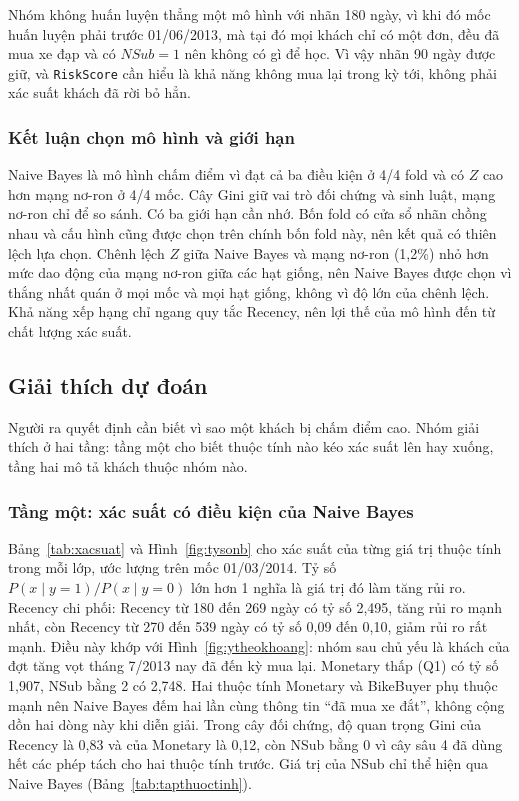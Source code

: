 \begin{table}[!htbp]
\centering
\caption{Tỷ lệ $y=1$ theo nhãn 90 ngày và 180 ngày tại các mốc có đủ cửa sổ 180 ngày}
\label{tab:nhan180}
\footnotesize

\end{table}

Nhóm không huấn luyện thẳng một mô hình với nhãn 180 ngày, vì khi đó mốc huấn luyện phải trước 01/06/2013, mà tại đó mọi khách chỉ có một đơn, đều đã mua xe đạp và có $NSub = 1$ nên không có gì để học. Vì vậy nhãn 90 ngày được giữ, và \texttt{RiskScore} cần hiểu là khả năng không mua lại trong kỳ tới, không phải xác suất khách đã rời bỏ hẳn.

\subsubsection{Kết luận chọn mô hình và giới hạn}
Naive Bayes là mô hình chấm điểm vì đạt cả ba điều kiện ở 4/4 fold và có $Z$ cao hơn mạng nơ-ron ở 4/4 mốc. Cây Gini giữ vai trò đối chứng và sinh luật, mạng nơ-ron chỉ để so sánh. Có ba giới hạn cần nhớ. Bốn fold có cửa sổ nhãn chồng nhau và cấu hình cũng được chọn trên chính bốn fold này, nên kết quả có thiên lệch lựa chọn. Chênh lệch $Z$ giữa Naive Bayes và mạng nơ-ron (1,2\%) nhỏ hơn mức dao động của mạng nơ-ron giữa các hạt giống, nên Naive Bayes được chọn vì thắng nhất quán ở mọi mốc và mọi hạt giống, không vì độ lớn của chênh lệch. Khả năng xếp hạng chỉ ngang quy tắc Recency, nên lợi thế của mô hình đến từ chất lượng xác suất.

\subsection{Giải thích dự đoán}\label{sec:giaithich}
Người ra quyết định cần biết vì sao một khách bị chấm điểm cao. Nhóm giải thích ở hai tầng: tầng một cho biết thuộc tính nào kéo xác suất lên hay xuống, tầng hai mô tả khách thuộc nhóm nào.

\subsubsection{Tầng một: xác suất có điều kiện của Naive Bayes}
Bảng~\ref{tab:xacsuat} và Hình~\ref{fig:tysonb} cho xác suất của từng giá trị thuộc tính trong mỗi lớp, ước lượng trên mốc 01/03/2014. Tỷ số $P(x \mid y=1)/P(x \mid y=0)$ lớn hơn 1 nghĩa là giá trị đó làm tăng rủi ro. Recency chi phối: Recency từ 180 đến 269 ngày có tỷ số 2,495, tăng rủi ro mạnh nhất, còn Recency từ 270 đến 539 ngày có tỷ số 0,09 đến 0,10, giảm rủi ro rất mạnh. Điều này khớp với Hình~\ref{fig:ytheokhoang}: nhóm sau chủ yếu là khách của đợt tăng vọt tháng 7/2013 nay đã đến kỳ mua lại. Monetary thấp (Q1) có tỷ số 1,907, NSub bằng 2 có 2,748. Hai thuộc tính Monetary và BikeBuyer phụ thuộc mạnh nên Naive Bayes đếm hai lần cùng thông tin ``đã mua xe đắt'', không cộng dồn hai dòng này khi diễn giải. Trong cây đối chứng, độ quan trọng Gini của Recency là 0,83 và của Monetary là 0,12, còn NSub bằng 0 vì cây sâu 4 đã dùng hết các phép tách cho hai thuộc tính trước. Giá trị của NSub chỉ thể hiện qua Naive Bayes (Bảng~\ref{tab:tapthuoctinh}).

